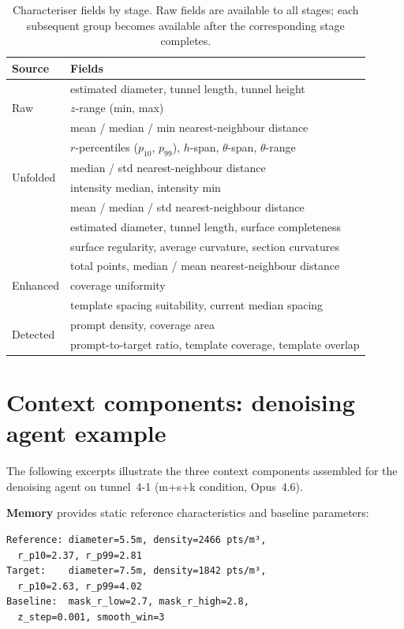 \documentclass[a4paper,fleqn]{cas-dc}
\begin{document}
\begin{table}[ht]
\caption{Characteriser fields by stage. Raw fields are available to all stages; each subsequent group becomes available after the corresponding stage completes.}\label{tab:chars}
\begin{tabular*}{\tblwidth}{@{} l l @{}}
\toprule
Source & Fields \\
\midrule
\multirow{3}{*}{Raw} & estimated diameter, tunnel length, tunnel height \\
 & $z$-range (min, max) \\
 & mean / median / min nearest-neighbour distance \\
\midrule
\multirow{4}{*}{Unfolded} & $r$-percentiles ($p_{10}$, $p_{99}$), $h$-span, $\theta$-span, $\theta$-range \\
 & median / std nearest-neighbour distance \\
 & intensity median, intensity min \\
\midrule
\multirow{3}{*}{Denoised} & mean / median / std nearest-neighbour distance \\
 & estimated diameter, tunnel length, surface completeness \\
 & surface regularity, average curvature, section curvatures \\
\midrule
\multirow{3}{*}{Enhanced} & total points, median / mean nearest-neighbour distance \\
 & coverage uniformity \\
 & template spacing suitability, current median spacing \\
\midrule
\multirow{2}{*}{Detected} & prompt density, coverage area \\
 & prompt-to-target ratio, template coverage, template overlap \\
\bottomrule
\end{tabular*}
\end{table}

\section{Context components: denoising agent example}\label{app:context}

The following excerpts illustrate the three context components assembled for the denoising agent on tunnel~4-1 (m+s+k condition, Opus~4.6).

\textbf{Memory} provides static reference characteristics and baseline parameters:
\begin{verbatim}
Reference: diameter=5.5m, density=2466 pts/m³,
  r_p10=2.37, r_p99=2.81
Target:    diameter=7.5m, density=1842 pts/m³,
  r_p10=2.63, r_p99=4.02
Baseline:  mask_r_low=2.7, mask_r_high=2.8,
  z_step=0.001, smooth_win=3
\end{verbatim}
\end{document}
